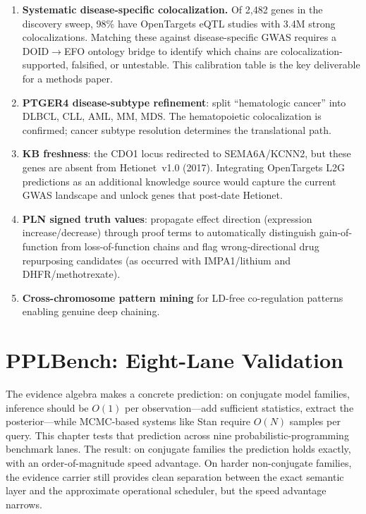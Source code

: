 \documentclass[11pt,openany]{report}
\begin{document}
\begin{enumerate}
\item \textbf{Systematic disease-specific colocalization.}
  Of 2{,}482 genes in the discovery sweep, 98\% have OpenTargets
  eQTL studies with 3.4M strong colocalizations.  Matching these
  against disease-specific GWAS requires a DOID$\to$EFO ontology
  bridge to identify which chains are colocalization-supported,
  falsified, or untestable.  This calibration table is the key
  deliverable for a methods paper.
\item \textbf{PTGER4 disease-subtype refinement}: split ``hematologic
  cancer'' into DLBCL, CLL, AML, MM, MDS.  The hematopoietic
  colocalization is confirmed; cancer subtype resolution determines
  the translational path.
\item \textbf{KB freshness}: the CDO1 locus redirected to
  SEMA6A/KCNN2, but these genes are absent from Hetionet~v1.0
  (2017).  Integrating OpenTargets L2G predictions as an
  additional knowledge source would capture the current GWAS
  landscape and unlock genes that post-date Hetionet.
\item \textbf{PLN signed truth values}: propagate effect direction
  (expression increase/decrease) through proof terms to
  automatically distinguish gain-of-function from
  loss-of-function chains and flag wrong-directional drug
  repurposing candidates (as occurred with IMPA1/lithium and
  DHFR/methotrexate).
\item \textbf{Cross-chromosome pattern mining} for LD-free
  co-regulation patterns enabling genuine deep chaining.
\end{enumerate}


\chapter{PPLBench: Eight-Lane Validation}
\label{ch:pplbench}

The evidence algebra makes a concrete prediction: on conjugate
model families, inference should be $O(1)$ per observation---add
sufficient statistics, extract the posterior---while MCMC-based
systems like Stan require $O(N)$ samples per query.  This chapter
tests that prediction across nine probabilistic-programming
benchmark lanes.  The result: on conjugate families the prediction
holds exactly, with an order-of-magnitude speed advantage.  On
harder non-conjugate families, the evidence carrier still provides
clean separation between the exact semantic layer and the
approximate operational scheduler, but the speed advantage narrows.
\end{document}

